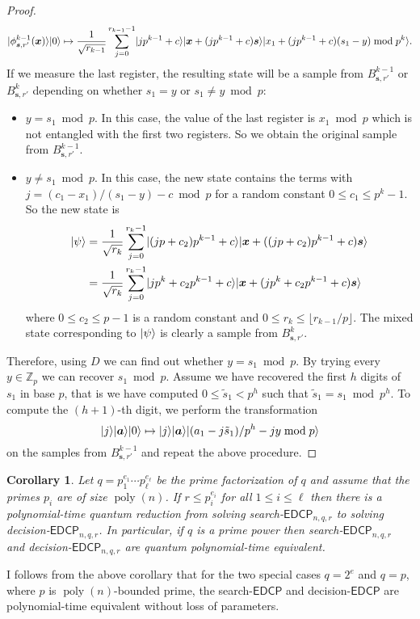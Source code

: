 \documentclass[11pt]{article}
\theoremstyle{plain}
\newtheorem{corollary}[theorem]{Corollary}
\theoremstyle{definition}
\DeclareMathOperator{\poly}{poly}
\DeclarePairedDelimiter{\ket}{\lvert}{\rangle}
\def\Z{\ensuremath{\mathbb{Z}}}
\def\edcp{\ensuremath{\mathsf{EDCP}}}
\begin{document}
\begin{proof}
    \[ \ket{\phi_{\bm{s}, r'}^{k - 1}(\bm{x})}\ket{0} \mapsto \frac{1}{\sqrt{r_{k - 1}}} \sum_{j = 0}^{r_{k - 1} - 1} \ket{jp^{k - 1} + c}\ket{\bm{x} + (jp^{k - 1} + c)\bm{s}}\ket{x_1 + (jp^{k - 1} + c)(s_1 - y) \bmod p^k}. \]
    If we measure the last register, the resulting state will be a sample from $B_{\bm{s}, r'}^{k - 1}$ or $B_{\bm{s}, r'}^k$ depending on whether $s_1 = y$ or $s_1 \ne y \bmod p$:
    \begin{itemize}
    \item $y = s_1 \bmod p$. In this case, the value of the last register is $x_1 \bmod p$ which is not entangled with the first two registers. So we obtain the original sample from $B_{\bm{s}, r'}^{k - 1}$.
    \item $y \ne s_1 \bmod p$. In this case, the new state contains the terms with $j = (c_1 - x_1) / (s_1 - y) - c \bmod p$ for a random constant $0 \le c_1 \le p^k - 1$. So the new state is
    \begin{align*}
        \ket{\psi}
        & = \frac{1}{\sqrt{r_k}} \sum_{j = 0}^{r_k - 1} \ket{(jp + c_2)p^{k - 1} + c}\ket{\bm{x} + ((jp + c_2)p^{k - 1} + c)\bm{s}} \\
        & = \frac{1}{\sqrt{r_k}} \sum_{j = 0}^{r_k - 1} \ket{jp^k + c_2p^{k - 1} + c}\ket{\bm{x} + (jp^k + c_2p^{k - 1} + c)\bm{s}}
    \end{align*}
    where $0 \le c_2 \le p - 1$ is a random constant and $0 \le r_k \le \lfloor r_{k - 1} / p \rfloor$. The mixed state corresponding to $\ket{\psi}$ is clearly a sample from $B_{\bm{s}, r'}^k$.
    \end{itemize}
    Therefore, using $D$ we can find out whether $y = s_1 \bmod p$. By trying every $y \in \Z_p$ we can recover $s_1 \bmod p$. Assume we have recovered the first $h$ digits of $s_1$ in base $p$, that is we have computed $0 \le \tilde{s}_1 < p^h$ such that $\tilde{s}_1 = s_1 \bmod p^h$. To compute the $(h + 1)$-th digit, we perform the transformation
    \[ \ket{j}\ket{\bm{a}}\ket{0} \mapsto \ket{j}\ket{\bm{a}}\ket{(a_1 - j\tilde{s}_1) / p^h - jy \bmod p}  \]
    on the samples from $B_{\bm{s}, r'}^{k - 1}$ and repeat the above procedure.
\end{proof}
\begin{corollary}
    Let $q = p_1^{e_1} \cdots p_\ell^{e_\ell}$ be the prime factorization of $q$ and assume that the primes $p_i$ are of size $\poly(n)$. If $r \le p_i^{e_i}$ for all $1 \le i \le \ell$ then there is a polynomial-time quantum reduction from solving search-$\edcp_{n, q, r}$ to solving decision-$\edcp_{n, q, r}$. In particular, if $q$ is a prime power then search-$\edcp_{n, q, r}$ and decision-$\edcp_{n, q, r}$ are quantum polynomial-time equivalent.
\end{corollary}
I follows from the above corollary that for the two special cases $q = 2^e$ and $q = p$, where $p$ is $\poly(n)$-bounded prime, the search-$\edcp$ and decision-$\edcp$ are polynomial-time equivalent without loss of parameters. 
\end{document}
